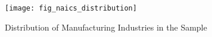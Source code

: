 \begin{figure}[H]
    \centering
    \texttt{[image: fig\_naics\_distribution]}
    \caption{Distribution of Manufacturing Industries in the Sample}
    \label{fig:naics-manufacturing-industries}
\end{figure}